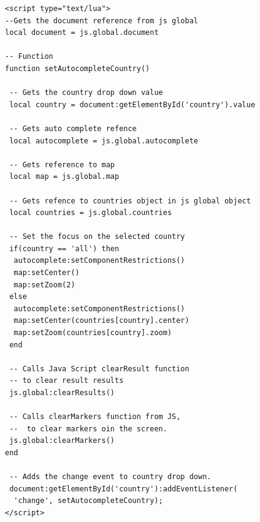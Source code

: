  \begin{lstlisting}[frame=single, style=base]
<script type="text/lua">
--Gets the document reference from js global
local document = js.global.document

-- Function
function setAutocompleteCountry()

 -- Gets the country drop down value
 local country = document:getElementById('country').value
 
 -- Gets auto complete refence
 local autocomplete = js.global.autocomplete
 
 -- Gets reference to map
 local map = js.global.map
 
 -- Gets refence to countries object in js global object
 local countries = js.global.countries

 -- Set the focus on the selected country
 if(country == 'all') then 
  autocomplete:setComponentRestrictions()
  map:setCenter()
  map:setZoom(2)
 else
  autocomplete:setComponentRestrictions()
  map:setCenter(countries[country].center)
  map:setZoom(countries[country].zoom)
 end

 -- Calls Java Script clearResult function
 -- to clear result results
 js.global:clearResults()
 
 -- Calls clearMarkers function from JS,
 --  to clear markers oin the screen.
 js.global:clearMarkers()
end

 -- Adds the change event to country drop down.
 document:getElementById('country'):addEventListener(
  'change', setAutocompleteCountry);
</script>
 \end{lstlisting} 


